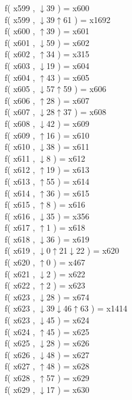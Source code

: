 f( x599 , $\downarrow$39 ) = x600 \\
f( x599 , $\downarrow$39$\uparrow$61 ) = x1692 \\
f( x600 , $\uparrow$39 ) = x601 \\
f( x601 , $\downarrow$59 ) = x602 \\
f( x602 , $\uparrow$34 ) = x315 \\
f( x603 , $\downarrow$19 ) = x604 \\
f( x604 , $\uparrow$43 ) = x605 \\
f( x605 , $\downarrow$57$\uparrow$59 ) = x606 \\
f( x606 , $\uparrow$28 ) = x607 \\
f( x607 , $\downarrow$28$\uparrow$37 ) = x608 \\
f( x608 , $\downarrow$42 ) = x609 \\
f( x609 , $\uparrow$16 ) = x610 \\
f( x610 , $\downarrow$38 ) = x611 \\
f( x611 , $\downarrow$8 ) = x612 \\
f( x612 , $\uparrow$19 ) = x613 \\
f( x613 , $\uparrow$55 ) = x614 \\
f( x614 , $\uparrow$36 ) = x615 \\
f( x615 , $\uparrow$8 ) = x616 \\
f( x616 , $\downarrow$35 ) = x356 \\
f( x617 , $\uparrow$1 ) = x618 \\
f( x618 , $\downarrow$36 ) = x619 \\
f( x619 , $\downarrow$0$\uparrow$21$\downarrow$22 ) = x620 \\
f( x620 , $\uparrow$0 ) = x467 \\
f( x621 , $\downarrow$2 ) = x622 \\
f( x622 , $\uparrow$2 ) = x623 \\
f( x623 , $\downarrow$28 ) = x674 \\
f( x623 , $\downarrow$39$\downarrow$46$\uparrow$63 ) = x1414 \\
f( x623 , $\downarrow$45 ) = x624 \\
f( x624 , $\uparrow$45 ) = x625 \\
f( x625 , $\downarrow$28 ) = x626 \\
f( x626 , $\downarrow$48 ) = x627 \\
f( x627 , $\uparrow$48 ) = x628 \\
f( x628 , $\uparrow$57 ) = x629 \\
f( x629 , $\downarrow$17 ) = x630 \\
